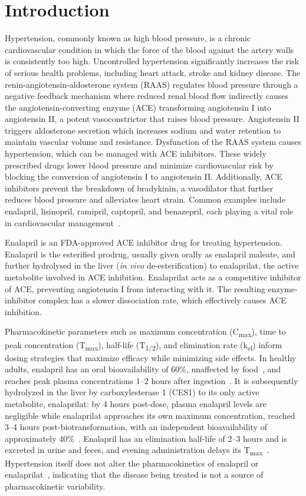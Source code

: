 \documentclass[pharmaceutics,article,submit,pdftex,moreauthors]{Definitions/mdpi}
\begin{document}
\section{Introduction}
Hypertension, commonly known as high blood pressure, is a chronic cardiovascular condition in which the force of the blood against the artery walls is consistently too high. Uncontrolled hypertension significantly increases the risk of serious health problems, including heart attack, stroke and kidney disease. The renin-angiotensin-aldosterone system (RAAS) regulates blood pressure through a negative feedback mechanism where reduced renal blood flow indirectly causes the angiotensin-converting enzyme (ACE) transforming angiotensin I into angiotensin II, a potent vasoconstrictor that raises blood pressure. Angiotensin II triggers aldosterone secretion which increases sodium and water retention to maintain vascular volume and resistance. Dysfunction of the RAAS system causes hypertension, which can be managed with ACE inhibitors. These widely prescribed drugs lower blood pressure and minimize cardiovascular risk by blocking the conversion of angiotensin I to angiotensin II. Additionally, ACE inhibitors prevent the breakdown of bradykinin, a vasodilator that further reduces blood pressure and alleviates heart strain. Common examples include enalapril, lisinopril, ramipril, captopril, and benazepril, each playing a vital role in cardiovascular management~\cite{Vertes1992}.

Enalapril is an FDA-approved ACE inhibitor drug for treating hypertension. Enalapril is the esterified prodrug, usually given orally as enalapril maleate, and further hydrolysed in the liver (\textit{in vivo} de-esterification) to enalaprilat, the active metabolite involved in ACE inhibition. Enalaprilat acts as a competitive inhibitor of ACE, preventing angiotensin I from interacting with it. The resulting enzyme-inhibitor complex has a slower dissociation rate, which effectively causes ACE inhibition. 

Pharmacokinetic parameters such as maximum concentration (C\textsubscript{max}), time to peak concentration (T\textsubscript{max}), half-life (T\textsubscript{1/2}), and elimination rate (k\textsubscript{el}) inform dosing strategies that maximize efficacy while minimizing side effects. In healthy adults, enalapril has an oral bioavailability of 60\%, unaffected by food~\cite{Swanson1984}, and reaches peak plasma concentrations 1--2 hours after ingestion~\cite{Dickstein1987, MacFadyen1993, Ulm1983, VanHecken2020}. It is subsequently hydrolyzed in the liver by carboxylesterase 1 (CES1) to its only active metabolite, enalaprilat: by 4 hours post-dose, plasma enalapril levels are negligible while enalaprilat approaches its own maximum concentration, reached 3--4 hours post-biotransformation, with an independent bioavailability of approximately 40\%~\cite{Davies1984, Till1984}. Enalapril has an elimination half-life of 2--3 hours and is excreted in urine and feces, and evening administration delays its T\textsubscript{max}~\cite{Weisser1991}. Hypertension itself does not alter the pharmacokinetics of enalapril or enalaprilat~\cite{Todd1992b}, indicating that the disease being treated is not a source of pharmacokinetic variability.
\end{document}
